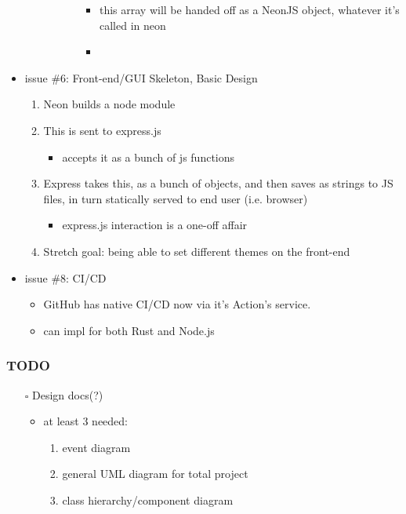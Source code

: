 \documentclass[11pt]{article}
\begin{document}
\begin{itemize}
\begin{itemize}
\begin{itemize}
\begin{itemize}
\begin{itemize}
\item this array will be handed off as a NeonJS object, whatever it's called in neon
\item 
\end{itemize}
\end{itemize}
\end{itemize}
\end{itemize}
\item issue \#6: Front-end/GUI Skeleton, Basic Design
\label{sec:org39ddf14}
\begin{enumerate}
\item Neon builds a node module
\item This is sent to express.js
\begin{itemize}
\item accepts it as a bunch of js functions
\end{itemize}
\item Express takes this, as a bunch of objects, and then saves as strings to JS files, in turn
statically served to end user (i.e. browser)
\begin{itemize}
\item express.js interaction is a one-off affair
\end{itemize}
\item Stretch goal: being able to set different themes on the front-end
\end{enumerate}
\item issue \#8: CI/CD
\label{sec:org79eef76}
\begin{itemize}
\item GitHub has native CI/CD now via it's Action's service.
\item can impl for both Rust and Node.js
\end{itemize}
\end{itemize}
\subsubsection*{{\bfseries\sffamily TODO} }
\label{sec:org502537d}
\begin{itemize}
\item[{$\square$}] Design docs(?)
\begin{itemize}
\item at least 3 needed:
\begin{enumerate}
\item event diagram
\item general UML diagram for total project
\item class hierarchy/component diagram
\end{enumerate}
\end{itemize}
\end{itemize}
\end{document}
